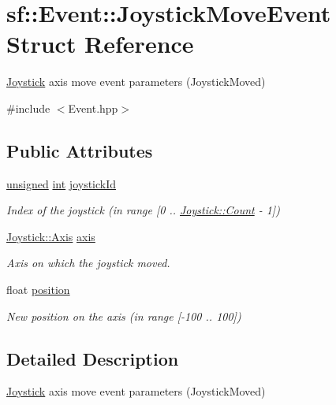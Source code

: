 \hypertarget{structsf_1_1_event_1_1_joystick_move_event}{\section{sf\-:\-:Event\-:\-:Joystick\-Move\-Event Struct Reference}
\label{structsf_1_1_event_1_1_joystick_move_event}
}


\hyperlink{classsf_1_1_joystick}{Joystick} axis move event parameters (Joystick\-Moved)  




{\ttfamily \#include $<$Event.\-hpp$>$}

\subsection*{Public Attributes}
\begin{DoxyCompactItemize}
\item 
\hyperlink{curses_8priv_8h_aca40206900cfc164654362fa8d4ad1e6}{unsigned} \hyperlink{term__entry_8h_ad65b480f8c8270356b45a9890f6499ae}{int} \hyperlink{structsf_1_1_event_1_1_joystick_move_event_a7bf2b2f2941a21ed26a67c95f5e4232f}{joystick\-Id}
\begin{DoxyCompactList}\small\item\em Index of the joystick (in range \mbox{[}0 .. \hyperlink{classsf_1_1_joystick_aa49548ab614125923944b5d340f67a77a58bb2e8f3749310d61097e4361bc0ba8}{Joystick\-::\-Count} -\/ 1\mbox{]}) \end{DoxyCompactList}\item 
\hyperlink{classsf_1_1_joystick_a48db337092c2e263774f94de6d50baa7}{Joystick\-::\-Axis} \hyperlink{structsf_1_1_event_1_1_joystick_move_event_add22e8126b7974271991dc6380cbdee3}{axis}
\begin{DoxyCompactList}\small\item\em Axis on which the joystick moved. \end{DoxyCompactList}\item 
float \hyperlink{structsf_1_1_event_1_1_joystick_move_event_aba5a70815420161375fd2e756689c32a}{position}
\begin{DoxyCompactList}\small\item\em New position on the axis (in range \mbox{[}-\/100 .. 100\mbox{]}) \end{DoxyCompactList}\end{DoxyCompactItemize}


\subsection{Detailed Description}
\hyperlink{classsf_1_1_joystick}{Joystick} axis move event parameters (Joystick\-Moved) 


